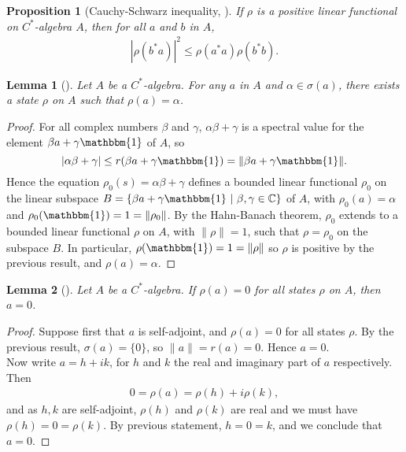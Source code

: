 \documentclass[12pt,a4paper]{report}
\theoremstyle{plain}
\newtheorem{lemma}{Lemma}
\newtheorem*{prop*}{Proposition}
\theoremstyle{definition}
\newcommand{\1}{\mathbbm{1}}
\newcommand{\C}{\mathbb{C}}
\newcommand{\spec}[1]{\sigma(#1)}
\begin{document}
\begin{prop*}[Cauchy-Schwarz inequality, {\cite[4.3.1]{kadison83}}]
	If $\rho$ is a positive linear functional on $C^\ast$-algebra $A$, then for all $a$ and $b$ in $A$,
	\begin{align*}
		|\rho(b^\ast a)|^2 \leq \rho(a^\ast a)\rho(b^\ast b).
	\end{align*}
\end{prop*}


\begin{lemma}[{\cite[4.3.3]{kadison83}}]
	Let $A$ be a $C^\ast$-algebra. For any $a$ in $A$ and $\alpha\in\spec{a}$, there exists a state
	$\rho$ on $A$ such that $\rho(a)=\alpha$.
\end{lemma}
\begin{proof}
	For all complex numbers $\beta$ and $\gamma$, $\alpha\beta+\gamma$ is a spectral value for the 
	element $\beta a+\gamma\1$ of $A$, so 
	\[
		|\alpha\beta+\gamma|\leq r(\beta a+\gamma\1)=\|\beta a+\gamma\1\|.
	\] 
	Hence the equation $\rho_0(s)=\alpha\beta+\gamma$ defines a bounded linear functional
	$\rho_0$ on the linear subspace $B= \{\beta a+\gamma\1 ~|~ \beta,\gamma\in\C\}$ of $A$, with 
	$\rho_0(a) =\alpha$ and $\rho_0(\1)=1=\|\rho_0\|$. By the Hahn-Banach theorem, 
	$\rho_0$ extends to a bounded linear functional $\rho$ on $A$, with $\|\rho\|=1$, such that 
	$\rho=\rho_0$ on the subspace $B$. In particular, $\rho(\1)=1=\|\rho\|$ so $\rho$ is positive by 
	the previous result, and $\rho(a)=\alpha$.
\end{proof}

\begin{lemma}[{\cite[4.3.4,(i)]{kadison83}}]\label{lemma:state1}
	Let $A$ be a $C^\ast$-algebra. If $\rho(a)=0$ for all states $\rho$ on $A$, then $a=0$.
\end{lemma}
\begin{proof}
	Suppose first that $a$ is self-adjoint, and $\rho(a)=0$ for all states $\rho$. By the previous
	result, $\spec{a}=\{0\}$, so $\|a\|=r(a)=0$. Hence $a=0$.			\\
	Now write $a=h+ik$, for $h$ and $k$ the real and imaginary part of $a$ respectively. Then
	\begin{align*}
		0=\rho(a)=\rho(h)+i\rho(k),
	\end{align*}
	and as $h,k$ are self-adjoint, $\rho(h)$ and $\rho(k)$ are real and we must have 
	$\rho(h)=0=\rho(k)$. By previous statement, $h=0=k$, and we conclude that $a=0$.
\end{proof}
\end{document}
